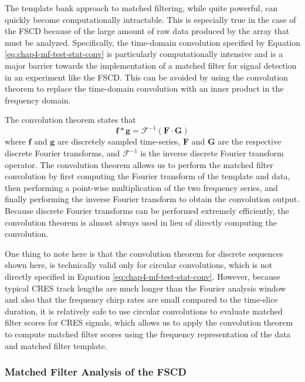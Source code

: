 The template bank approach to matched filtering, while quite powerful, can quickly become computationally intractable. This is especially true in the case of the FSCD because of the large amount of raw data produced by the array that must be analyzed. Specifically, the time-domain convolution specified by Equation \ref{eq:chap4-mf-test-stat-conv} is particularly computationally intensive and is a major barrier towards the implementation of a matched filter for signal detection in an experiment like the FSCD. This can be avoided by using the convolution theorem to replace the time-domain convolution with an inner product in the frequency domain. 

The convolution theorem states that 
\begin{equation}
    \bm{f}\ast\bm{g} = \mathcal{F}^{-1}\left(\bm{F}\cdot \bm{G}\right)
    \label{eq:chap4-conv-theorem}
\end{equation}
where $\bm{f}$ and $\bm{g}$ are discretely sampled time-series, $\bm{F}$ and $\bm{G}$ are the respective discrete Fourier transforms, and $\mathcal{F}^{-1}$ is the inverse discrete Fourier transform operator. The convolution theorem allows us to perform the matched filter convolution by first computing the Fourier transform of the template and data, then performing a point-wise multiplication of the two frequency series, and finally performing the inverse Fourier transform to obtain the convolution output. Because discrete Fourier transforms can be performed extremely efficiently, the convolution theorem is almost always used in lieu of directly computing the convolution. 

One thing to note here is that the convolution theorem for discrete sequences shown here, is technically valid only for circular convolutions, which is not directly specified in Equation \ref{eq:chap4-mf-test-stat-conv}. However, because typical CRES track lengths are much longer than the Fourier analysis window and also that the frequency chirp rates are small compared to the time-slice duration, it is relatively safe to use circular convolutions to evaluate matched filter scores for CRES signals, which allows us to apply the convolution theorem to compute matched filter scores using the frequency representation of the data and matched filter template.

\subsubsection*{Matched Filter Analysis of the FSCD}

